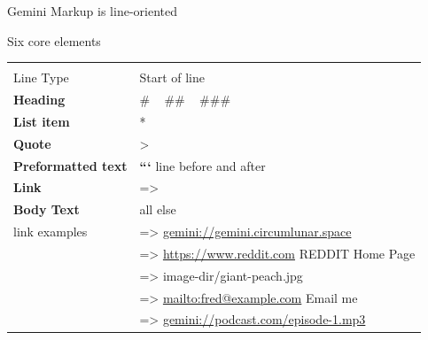 \documentclass[presentation, 11pt,  aspectratio=169]{beamer}
\renewcommand{\alert}[1]{\textbf{\textcolor{mydarkred}{#1}}}
\begin{document}
\begin{frame}[label={sec:org595aef2}]{Gemini Markup is line-oriented}
\begin{block}{Six core elements}
\begin{center}
\begin{tabular}{ll}
 & \\
Line Type & Start of line\\
\hline
\alert{Heading} & \# ~ \#\# ~ \#\#\#\\
\alert{List item} & *\\
\alert{Quote} & >\\
\alert{Preformatted text} & \alert{```} line before and after\\
\alert{Link} & =>\\
\alert{Body Text} & all else\\
\hline
link examples & => \href{gemini://gemini.circumlunar.space}{gemini://gemini.circumlunar.space}\\
 & => \url{https://www.reddit.com} REDDIT Home Page\\
 & => image-dir/giant-peach.jpg\\
 & => \url{mailto:fred@example.com}  Email me\\
 & => \href{gemini://podcast.com/episode-1.mp3}{gemini://podcast.com/episode-1.mp3}\\
\hline
\end{tabular}
\end{center}
\end{block}
\end{frame}
\end{document}
